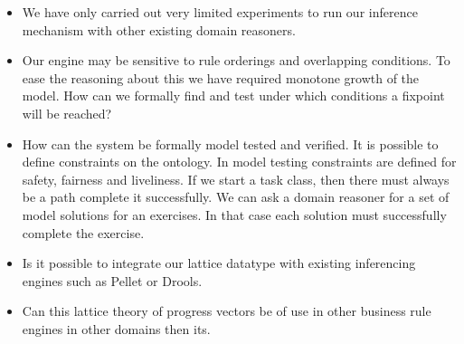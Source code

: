 \begin{itemize}

\item We have only carried out very limited experiments to run our inference mechanism with other existing domain reasoners.
\item Our engine may be sensitive to rule orderings and overlapping conditions.
To ease the reasoning about this we have required monotone growth of the model.
How can we formally find and test under which conditions a fixpoint will be reached?
\item How can the system be formally model tested and verified.
It is possible to define constraints on the ontology.
In model testing constraints are defined for safety, fairness and liveliness.
If we start a task class, then there must always be a path complete it successfully.
We can ask a domain reasoner for a set of model solutions for an exercises. 
In that case each solution must successfully complete the exercise.
\item Is it possible to integrate our lattice datatype with existing inferencing engines such as Pellet or Drools.
\item Can this lattice theory of progress vectors be of use in other business rule engines in other domains then \gls{its}.
\end{itemize}





